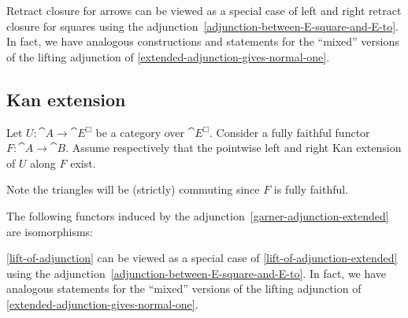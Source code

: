 \documentclass[reqno,10pt,a4paper,oneside]{amsart}
\begin{document}
\begin{remark}
\label{slicing-mixed}
Retract closure for arrows can be viewed as a special case of left and right retract closure for squares using the adjunction~\eqref{adjunction-between-E-square-and-E-to}.
In fact, we have analogous constructions and statements for the ``mixed'' versions of the lifting adjunction of \cref{extended-adjunction-gives-normal-one}.
\end{remark}

\subsection{Kan extension}

Let $U : \cat{A} \to \cat{E}^{\Box}$ be a category over $\cat{E}^{\Box}$.
Consider a fully faithful functor $F : \cat{A} \to \cat{B}$.
Assume respectively that the pointwise left and right Kan extension of $U$ along $F$ exist.
Note the triangles will be (strictly) commuting since $F$ is fully faithful.

\begin{lemma}
\label{kan-extension-closure-extended}
The following functors induced by the adjunction~\eqref{garner-adjunction-extended} are isomorphisms:
\end{lemma}

\begin{remark}
\label{kan-extension-closure-mixed}
\cref{lift-of-adjunction} can be viewed as a special case of \cref{lift-of-adjunction-extended} using the adjunction~\eqref{adjunction-between-E-square-and-E-to}.
In fact, we have analogous statements for the ``mixed'' versions of the lifting adjunction of \cref{extended-adjunction-gives-normal-one}.
\end{remark}
\end{document}
